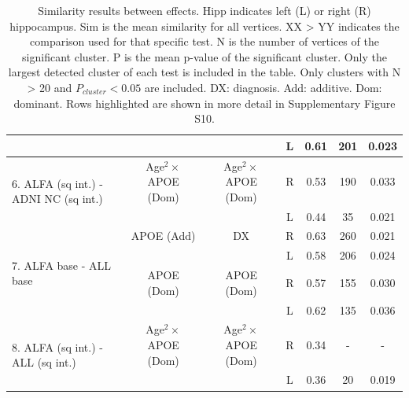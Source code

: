 \begin{table}[htbp]
{\begin{tabular}{@{}p{7cm}cccccc}
                              & \cellcolor{Gray}   & \cellcolor{Gray} &  \cellcolor{Gray} L   & \cellcolor{Gray} 0.61 & \cellcolor{Gray} 201 & \cellcolor{Gray} 0.023 \\ \midrule
\multirow{2}{*}{6. ALFA (sq int.) - ADNI NC (sq int.)} & Age$^2\times$APOE (Dom) & Age$^2\times$APOE (Dom)  & R    & 0.53 & 190 & 0.033 \\
                               &     &          & L    & 0.44 & 35 & 0.021 \\ \midrule
\multirow{4}{*}{7. ALFA base - ALL base}  &  APOE (Add)      & DX   & R   & 0.63 & 260 & 0.021 \\ 
                              &      &          & L    & 0.58 & 206 & 0.024 \\
                              &   APOE (Dom)      & APOE (Dom)   & R   & 0.57 & 155 & 0.030 \\ 
                              &       &          & L    & 0.62 & 135 & 0.036 \\ \midrule
\multirow{2}{*}{8. ALFA (sq int.) - ALL (sq int.)}     & Age$^2\times$APOE (Dom) & Age$^2\times$APOE (Dom)  & R  & 0.34 & - & - \\
                               &          &          & L    & 0.36 & 20 & 0.019 \\ \bottomrule 
\end{tabular}}
\caption[Similarity results between effects.]{Similarity results between effects. Hipp indicates left (L) or right (R) hippocampus. Sim is the mean similarity for all vertices. XX > YY indicates the comparison used for that specific test. N is the number of vertices of the significant cluster. P is the mean p-value of the significant cluster. Only the largest detected cluster of each test is included in the table. Only clusters with N > 20 and $P_{cluster} < 0.05$ are included. DX: diagnosis. Add: additive. Dom: dominant. Rows highlighted are shown in more detail in Supplementary Figure S10.}\label{table:sim}
\end{table}


